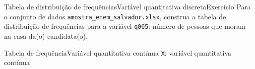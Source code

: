 \documentclass[
  10pt,
  ignorenonframetext,
]{beamer}
\begin{document}
\begin{frame}[fragile]{Tabela de distribuição de
frequências\newline Variável quantitativa discreta\newline Exercício}
\protect\hypertarget{tabela-de-distribuiuxe7uxe3o-de-frequuxeanciasvariuxe1vel-quantitativa-discretaexercuxedcio}{}
Para o conjunto de dados \texttt{amostra\_enem\_salvador.xlsx}, construa
a tabela de distribuição de frequências para a variável \texttt{q005}:
número de pessoas que moram na casa da(o) candidata(o).
\end{frame}

\begin{frame}[fragile]{Tabela de frequência\newline Variável
quantitativa contínua}
\protect\hypertarget{tabela-de-frequuxeanciavariuxe1vel-quantitativa-contuxednua}{}
\texttt{X}: variável quantitativa contínua


\end{frame}
\end{document}
